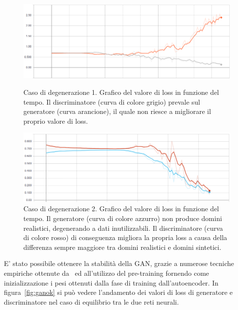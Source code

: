 \begin{figure}[!bp]
    \centering
    \includegraphics[width=\columnwidth]{figures/gan/ganfailure1.png}
    \caption{Caso di degenerazione 1. Grafico del valore di loss in funzione del tempo. Il discriminatore (curva di colore grigio) prevale sul generatore (curva arancione), il quale non riesce a migliorare il proprio valore di loss.\label{fig:ganfailure1}}
	\vspace{3cm}
    \centering
    \includegraphics[width=\columnwidth]{figures/gan/ganfailure2.png}
    \caption{Caso di degenerazione 2. Grafico del valore di loss in funzione del tempo. Il generatore (curva di colore azzurro) non produce domini realistici, degenerando a dati inutilizzabili. Il discriminatore (curva di colore rosso) di conseguenza migliora la propria loss a causa della differenza sempre maggiore tra domini realistici e domini sintetici. \label{fig:ganfailure2}}
\end{figure}

E' stato possibile ottenere la stabilità della GAN, grazie a numerose tecniche empiriche ottenute da~\cite{1606.03498} ed all'utilizzo del pre-training fornendo come inizializzazione i pesi ottenuti dalla fase di training dall'autoencoder. In figura~\ref{fig:ganok} si può vedere l'andamento dei valori di loss di generatore e discriminatore nel caso di equilibrio tra le due reti neurali.

